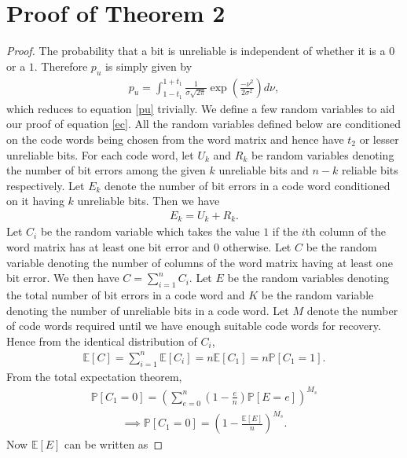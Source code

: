 \documentclass[conference]{IEEEtran}
\begin{document}
\section{Proof of Theorem 2}
\begin{proof}
The probability that a bit is unreliable is independent of whether it is a $0$ or a $1$. Therefore $p_u$ is simply given by
\begin{align*}
    p_u = \int_{1-t_1}^{1+t_1}  \frac{1}{\sigma \sqrt{2\pi}} \exp \left(\frac{-\nu^2}{2\sigma^2}\right) d\nu,
\end{align*}
which reduces to equation \eqref{pu} trivially.
We define a few random variables to aid our proof of equation \eqref{ec}. All the random variables defined below are conditioned on the code words being chosen from the word matrix and hence have $t_2$ or lesser unreliable bits. For each code word, let $U_k$ and $R_k$ be random variables denoting the number of bit errors among the given $k$ unreliable bits and $n-k$ reliable bits respectively. Let $E_k$ denote the number of bit errors in a code word conditioned on it having $k$ unreliable bits. Then we have
\begin{align*}
    E_k = U_k + R_k.
\end{align*}
Let $C_i$ be the random variable which takes the value $1$ if the $i$th column of the word matrix has at least one bit error and $0$ otherwise. Let $C$ be the random variable denoting the number of columns of the word matrix having at least one bit error. We then have 
    $C = \sum_{i=1}^n C_i$.
Let $E$ be the random variables denoting the total number of bit errors in a code word and $K$ be the random variable denoting the number of unreliable bits in a code word. Let $M$ denote the number of code words required until we have enough suitable code words for recovery. Hence from the identical distribution of $C_i$,
\begin{align}\label{ecog}
    \mathbb{E}[C] = \sum_{i=1}^n \mathbb{E}[C_i] = n\mathbb{E}[C_1] = n\mathbb{P}[C_1=1].
\end{align}
From the total expectation theorem,
\begin{align*}
    \mathbb{P}[C_1=0] = \left(\displaystyle \sum_{e=0}^n \left( 1-\frac{e}{n}\right) \mathbb{P}[E = e]\right)^{M_s}
\end{align*}
\begin{align}\label{pc1is0}
    \implies \mathbb{P}[C_1=0] = \left(\displaystyle 1-\frac{\mathbb{E}[E]}{n}\right)^{M_s}.
\end{align}
Now $\mathbb{E}[E]$ can be written as

\end{proof}
\end{document}
